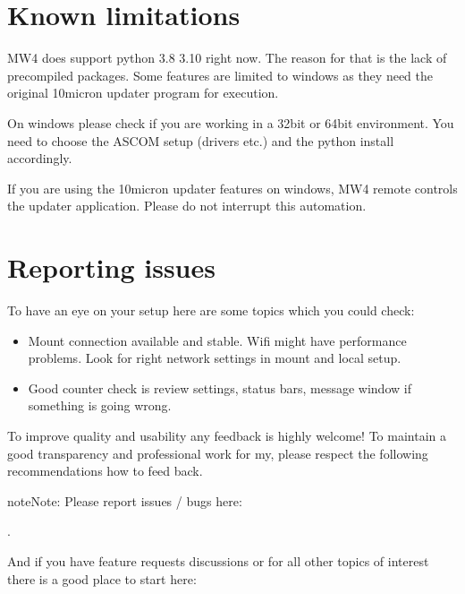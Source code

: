 \documentclass[a4paper,10pt,english]{sphinxmanual}
\begin{document}
\chapter{Known limitations}
\label{\detokenize{index:known-limitations}}
\sphinxAtStartPar
MW4 does support python 3.8 \sphinxhyphen{} 3.10 right now. The reason for that is the
lack of precompiled packages. Some features are limited to windows as they need
the original 10micron updater program for execution.

\sphinxAtStartPar
On windows please check if you are working in a 32bit or 64bit environment. You
need to choose the ASCOM setup (drivers etc.) and the python install accordingly.

\sphinxAtStartPar
If you are using the 10micron updater features on windows, MW4 remote controls the
updater application. Please do not interrupt this automation.


\chapter{Reporting issues}
\label{\detokenize{index:reporting-issues}}
\sphinxAtStartPar
To have an eye on your setup here are some topics which you could check:
\begin{itemize}
\item {} 
\sphinxAtStartPar
Mount connection available and stable. Wifi might have performance problems.
Look for right network settings in mount and local setup.

\item {} 
\sphinxAtStartPar
Good counter check is review settings, status bars, message window if something
is going wrong.

\end{itemize}

\sphinxAtStartPar
To improve quality and usability any feedback is highly welcome! To maintain a good
transparency and professional work for my, please respect the following
recommendations how to feed back.

\begin{sphinxadmonition}{note}{Note:}
\sphinxAtStartPar
Please report issues / bugs here:

\sphinxAtStartPar
{}.

\sphinxAtStartPar
And if you have feature requests discussions or for all other topics of
interest there is a good place to start here:

\sphinxAtStartPar
{}
\end{sphinxadmonition}
\end{document}

